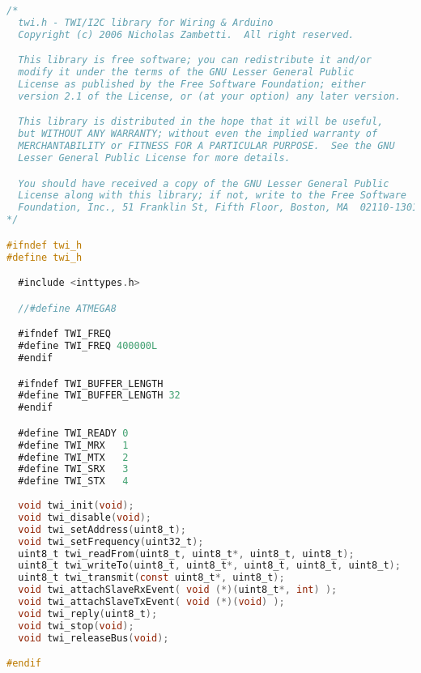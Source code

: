 \begin{lstlisting}[language=C, label={lst:modified_twi_h}, caption=Modifizierte \emph{twi.h} um \ac{I2C} im \emph{Fast-Mode} zu betreiben]
/*
  twi.h - TWI/I2C library for Wiring & Arduino
  Copyright (c) 2006 Nicholas Zambetti.  All right reserved.

  This library is free software; you can redistribute it and/or
  modify it under the terms of the GNU Lesser General Public
  License as published by the Free Software Foundation; either
  version 2.1 of the License, or (at your option) any later version.

  This library is distributed in the hope that it will be useful,
  but WITHOUT ANY WARRANTY; without even the implied warranty of
  MERCHANTABILITY or FITNESS FOR A PARTICULAR PURPOSE.  See the GNU
  Lesser General Public License for more details.

  You should have received a copy of the GNU Lesser General Public
  License along with this library; if not, write to the Free Software
  Foundation, Inc., 51 Franklin St, Fifth Floor, Boston, MA  02110-1301  USA
*/

#ifndef twi_h
#define twi_h

  #include <inttypes.h>

  //#define ATMEGA8

  #ifndef TWI_FREQ
  #define TWI_FREQ 400000L
  #endif

  #ifndef TWI_BUFFER_LENGTH
  #define TWI_BUFFER_LENGTH 32
  #endif

  #define TWI_READY 0
  #define TWI_MRX   1
  #define TWI_MTX   2
  #define TWI_SRX   3
  #define TWI_STX   4
  
  void twi_init(void);
  void twi_disable(void);
  void twi_setAddress(uint8_t);
  void twi_setFrequency(uint32_t);
  uint8_t twi_readFrom(uint8_t, uint8_t*, uint8_t, uint8_t);
  uint8_t twi_writeTo(uint8_t, uint8_t*, uint8_t, uint8_t, uint8_t);
  uint8_t twi_transmit(const uint8_t*, uint8_t);
  void twi_attachSlaveRxEvent( void (*)(uint8_t*, int) );
  void twi_attachSlaveTxEvent( void (*)(void) );
  void twi_reply(uint8_t);
  void twi_stop(void);
  void twi_releaseBus(void);

#endif
\end{lstlisting}